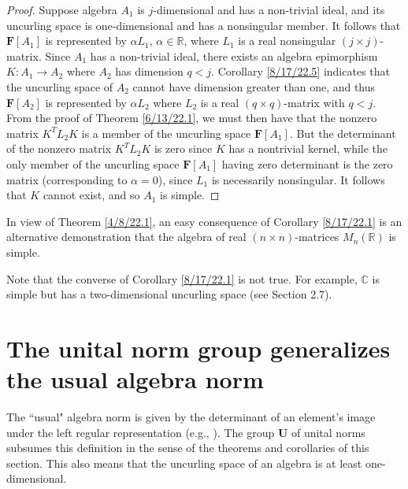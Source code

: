 \documentclass{amsart}
\numberwithin{equation}{section}
\theoremstyle{definition}
\numberwithin{theorem}{section}
\begin{document}
\begin{proof} Suppose algebra $A_1$ is $j$-dimensional and has a non-trivial ideal, and its uncurling space is one-dimensional and has a nonsingular member.  It follows that $\mathbf{F}[A_1]$ is represented by  $\alpha L_1$, $\alpha\in \mathbb{R}$, where $L_1$ is a real nonsingular $(j\times j)$-matrix.  Since $A_1$ has a non-trivial ideal, there exists an algebra epimorphism $K:A_1\rightarrow A_2$ where $A_2$ has dimension $q<j$.  Corollary \ref{8/17/22.5} indicates that the uncurling space of $A_2$ cannot have dimension greater than one, and thus $\mathbf{F}[A_2]$ is represented by $\alpha L_2$ where $L_2$ is a real $(q\times q)$-matrix with $q<j$. From the proof of Theorem \ref{6/13/22.1}, we must then have that the nonzero matrix $ K^T L_2 K$ is a member of the uncurling space $\mathbf{F}[A_1]$.  But the determinant of the nonzero matrix $ K^T L_2 K$ is zero since $K$ has a nontrivial kernel, while the only member of the uncurling space $\mathbf{F}[A_1]$ having zero determinant is the zero matrix (corresponding to $\alpha=0$), since $L_1$ is necessarily nonsingular.   It follows that $K$ cannot exist, and so $A_1$ is simple. \end{proof}


In view of Theorem \ref{4/8/22.1}, an easy consequence of Corollary \ref{8/17/22.1} is an alternative demonstration that the algebra of real $(n\times n)$-matrices $ M_n(\mathbb{R})$ is simple.  

Note that the converse of Corollary \ref{8/17/22.1} is not true.  For example, $\mathbb{C}$ is simple but has a two-dimensional uncurling space (see Section 2.7).


\section{The unital norm group generalizes the usual algebra norm} 

The ``usual" algebra norm is given by the determinant of an element's image under the left regular representation (e.g., \cite{bourbaki:1989}).  The group $\mathbf{U}$ of unital norms subsumes this definition in the sense of the theorems and corollaries of this section.  This also means that the uncurling space of an algebra is at least one-dimensional.
\end{document}
